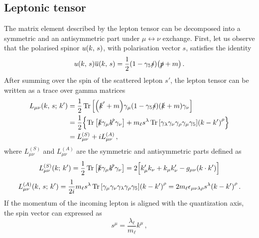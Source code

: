 \subsection*{Leptonic tensor}
The matrix element described by the lepton tensor can be decomposed into a symmetric and an antisymmetric part under $\mu \leftrightarrow \nu$ exchange. First, let us observe that the polarised spinor $u \qty(k, \, s)$, with polarisation vector $s$, satisfies the identity 
\begin{equation}
    u \qty(k, \, s) \overline{u} \qty(k,\,s) = \frac{1}{2} (1 - \gamma_5 \slashed{s})  \qty(\slashed{p} + m)\,.
\end{equation}
After summing over the spin of the scattered lepton $s'$, the lepton tensor can be written as a trace over gamma matrices
\begin{equation}
    \begin{split}
        L_{\mu \nu} \qty(k,\,s;\, k') &= \frac{1}{2} \Trace \qty[ \qty(\slashed{k}' + m) \gamma_{\mu} \qty(1 - \gamma_5 \slashed{s}) \qty(\slashed{k} + m) \gamma_{\nu} ]\\
        & = \frac{1}{2} \Bigl\{ \Trace \qty[ \slashed{k} \gamma_{\mu} \slashed{k'} \gamma_{\nu} ] + m_{\ell} s^{\lambda} \Trace \qty[ \gamma_{\lambda} \gamma_{\nu} \gamma_{\rho} \gamma_{\mu} \gamma_{5} ] \qty( k - k' )^{\rho} \Bigr\}\\
        & = L_{\mu \nu}^{(S)} + i L_{\mu \nu}^{(A)} \,,
    \end{split}
\end{equation}
where $L_{\mu \nu}^{(S)}$ and $L_{\mu \nu}^{(A)}$ are the symmetric and antisymmetric parts defined as 
\begin{equation}
  L_{\mu \nu}^{(S)} \qty(k;\, k') = \frac{1}{2} \Trace \qty[ \slashed{k} \gamma_{\mu} \slashed{k'} \gamma_{\nu} ] = 2 \Bigl[k'_{\mu} k_{\nu} + k_{\mu} k_{\nu}' - g_{\mu \nu} \qty( k \cdot k' ) \Bigr]
\end{equation}
\begin{equation}
  L_{\mu \nu}^{(A)} \qty(k,\,s;\, k') = \frac{1}{2i} m_{\ell} s^{\lambda} \Trace \qty[  \gamma_{\mu} \gamma_{\nu} \gamma_{\lambda} \gamma_{\rho} \gamma_{5} ] \qty( k - k' )^{\rho} = 2m_{\ell} \epsilon_{\mu \nu \lambda \rho } s^{\lambda} \qty( k - k' )^{\rho}\,.
\end{equation}
If the momentum of the incoming lepton is aligned with the quantization axis, the spin vector can expressed as
\begin{equation}
    s^{\mu} = \frac{\lambda_{\ell}}{m_{\ell}} k^{\mu}\, ,
    \label{eq:ch2:spin_vector}
\end{equation}
